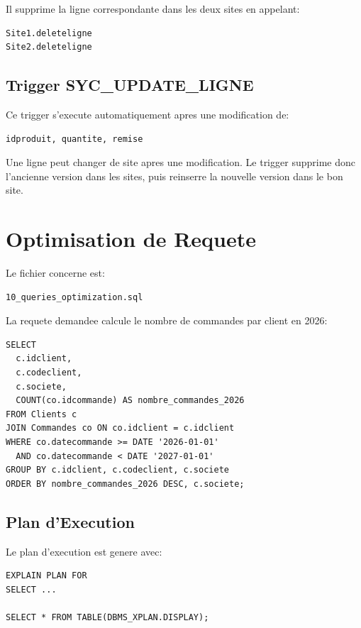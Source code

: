 \documentclass[12pt,a4paper]{report}
\begin{document}
Il supprime la ligne correspondante dans les deux sites en appelant:

\begin{lstlisting}[style=textstyle]
Site1.deleteligne
Site2.deleteligne
\end{lstlisting}

\section{Trigger SYC\_UPDATE\_LIGNE}

Ce trigger s'execute automatiquement apres une modification de:

\begin{lstlisting}[style=textstyle]
idproduit, quantite, remise
\end{lstlisting}

Une ligne peut changer de site apres une modification. Le trigger supprime donc l'ancienne version dans les sites, puis reinserre la nouvelle version dans le bon site.

\chapter{Optimisation de Requete}

Le fichier concerne est:

\begin{lstlisting}[style=textstyle]
10_queries_optimization.sql
\end{lstlisting}

La requete demandee calcule le nombre de commandes par client en 2026:

\begin{lstlisting}[style=sqlstyle]
SELECT
  c.idclient,
  c.codeclient,
  c.societe,
  COUNT(co.idcommande) AS nombre_commandes_2026
FROM Clients c
JOIN Commandes co ON co.idclient = c.idclient
WHERE co.datecommande >= DATE '2026-01-01'
  AND co.datecommande < DATE '2027-01-01'
GROUP BY c.idclient, c.codeclient, c.societe
ORDER BY nombre_commandes_2026 DESC, c.societe;
\end{lstlisting}

\section{Plan d'Execution}

Le plan d'execution est genere avec:

\begin{lstlisting}[style=sqlstyle]
EXPLAIN PLAN FOR
SELECT ...

SELECT * FROM TABLE(DBMS_XPLAN.DISPLAY);
\end{lstlisting}
\end{document}
